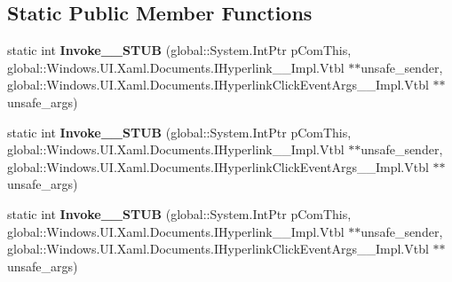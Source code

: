 \subsection*{Static Public Member Functions}
\begin{DoxyCompactItemize}
\item 
\mbox{\label{struct_windows_1_1_foundation_1_1_typed_event_handler___a___windows___u_i___xaml___documents___hfd9a29b8a1965140a2921dbd50b4ecfb_a58c50eaf000838116445cd3c7cc1f441}} 
static int {\bfseries Invoke\+\_\+\+\_\+\+S\+T\+UB} (global\+::\+System.\+Int\+Ptr p\+Com\+This, global\+::\+Windows.\+U\+I.\+Xaml.\+Documents.\+I\+Hyperlink\+\_\+\+\_\+\+Impl.\+Vtbl $\ast$$\ast$unsafe\+\_\+sender, global\+::\+Windows.\+U\+I.\+Xaml.\+Documents.\+I\+Hyperlink\+Click\+Event\+Args\+\_\+\+\_\+\+Impl.\+Vtbl $\ast$$\ast$unsafe\+\_\+args)
\item 
\mbox{\label{struct_windows_1_1_foundation_1_1_typed_event_handler___a___windows___u_i___xaml___documents___hfd9a29b8a1965140a2921dbd50b4ecfb_a58c50eaf000838116445cd3c7cc1f441}} 
static int {\bfseries Invoke\+\_\+\+\_\+\+S\+T\+UB} (global\+::\+System.\+Int\+Ptr p\+Com\+This, global\+::\+Windows.\+U\+I.\+Xaml.\+Documents.\+I\+Hyperlink\+\_\+\+\_\+\+Impl.\+Vtbl $\ast$$\ast$unsafe\+\_\+sender, global\+::\+Windows.\+U\+I.\+Xaml.\+Documents.\+I\+Hyperlink\+Click\+Event\+Args\+\_\+\+\_\+\+Impl.\+Vtbl $\ast$$\ast$unsafe\+\_\+args)
\item 
\mbox{\label{struct_windows_1_1_foundation_1_1_typed_event_handler___a___windows___u_i___xaml___documents___hfd9a29b8a1965140a2921dbd50b4ecfb_a58c50eaf000838116445cd3c7cc1f441}} 
static int {\bfseries Invoke\+\_\+\+\_\+\+S\+T\+UB} (global\+::\+System.\+Int\+Ptr p\+Com\+This, global\+::\+Windows.\+U\+I.\+Xaml.\+Documents.\+I\+Hyperlink\+\_\+\+\_\+\+Impl.\+Vtbl $\ast$$\ast$unsafe\+\_\+sender, global\+::\+Windows.\+U\+I.\+Xaml.\+Documents.\+I\+Hyperlink\+Click\+Event\+Args\+\_\+\+\_\+\+Impl.\+Vtbl $\ast$$\ast$unsafe\+\_\+args)
\item 
\mbox{\label{struct_windows_1_1_foundation_1_1_typed_event_handler___a___windows___u_i___xaml___documents___hfd9a29b8a1965140a2921dbd50b4ecfb_a58c50eaf000838116445cd3c7cc1f441}} 

\end{DoxyCompactItemize}
